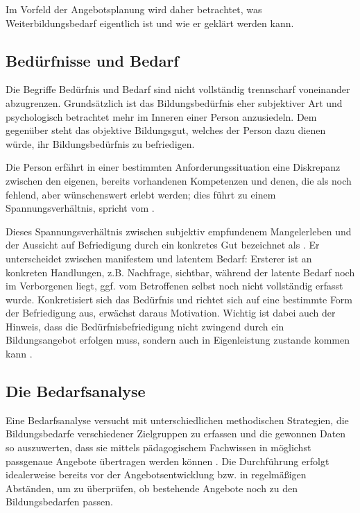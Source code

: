 \documentclass[
  twoside,
  parskip=half-,
]{scrreprt}
\begin{document}
Im Vorfeld der Angebotsplanung wird daher betrachtet, was Weiterbildungsbedarf eigentlich ist und wie er geklärt werden kann.

    \subsection{Bedürfnisse und Bedarf}

    Die Begriffe Bedürfnis und Bedarf sind nicht vollständig trennscharf voneinander abzugrenzen.  Grundsätzlich ist das Bildungsbedürfnis eher subjektiver Art und psychologisch betrachtet mehr im Inneren einer Person anzusiedeln. Dem gegenüber steht das objektive Bildungsgut, welches der Person dazu dienen würde, ihr Bildungsbedürfnis zu befriedigen. 

    Die Person erfährt in einer bestimmten Anforderungssituation eine Diskrepanz zwischen den eigenen, bereits vorhandenen Kompetenzen und denen, die als noch fehlend, aber wünschenswert erlebt werden; dies führt zu einem Spannungsverhältnis, \citeauthor{schlutz} spricht vom  \autocite[42]{schlutz}.

    Dieses Spannungsverhältnis zwischen subjektiv empfundenem Mangelerleben und der Aussicht auf Befriedigung durch ein konkretes Gut bezeichnet \citeauthor{schlutz} als . Er unterscheidet zwischen manifestem und latentem Bedarf: Ersterer ist an konkreten Handlungen, z.B. Nachfrage, sichtbar, während der latente Bedarf noch im Verborgenen liegt, ggf. vom Betroffenen selbst noch nicht vollständig erfasst wurde. Konkretisiert sich das Bedürfnis und richtet sich auf eine bestimmte Form der Befriedigung aus, erwächst daraus Motivation. Wichtig ist dabei auch der Hinweis, dass die Bedürfnisbefriedigung nicht zwingend durch ein Bildungsangebot erfolgen muss, sondern auch in Eigenleistung zustande kommen kann \autocite[vgl.][41]{schlutz}.
    
    \subsection{Die Bedarfsanalyse}

Eine Bedarfsanalyse versucht mit unterschiedlichen methodischen Strategien, die Bildungsbedarfe verschiedener Zielgruppen zu erfassen und die gewonnen Daten so auszuwerten, dass sie mittels pädagogischem Fachwissen in möglichst passgenaue Angebote übertragen werden können \autocite[vgl.][5]{kos}. Die Durchführung erfolgt idealerweise bereits vor der Angebotsentwicklung bzw. in regelmäßigen Abständen, um zu überprüfen, ob bestehende Angebote noch zu den Bildungsbedarfen passen.
\end{document}
